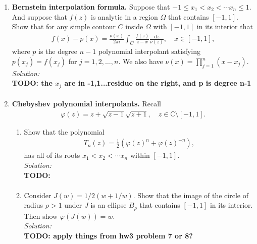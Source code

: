 \documentclass[10pt]{amsart}
\newcommand{\D}{\mathrm{d}}
\theoremstyle{nonumberplain}
\begin{document}
\begin{enumerate}[label={\bf {\arabic*}:}]
\newpage


\item \textbf{Bernstein interpolation formula.}   Suppose that $-1 \leq x_1 < x_2 < \cdots x_n \leq 1$. 
And suppose that $f(z)$ is analytic in a region $\Omega$ that contains $[-1,1]$.
Show that for any simple contour $C$ inside $\Omega$ with $[-1,1]$ in its interior that
\begin{align*}
	f(x) - p(x) = \frac{\nu(x)}{2 \pi i} \int_C \frac{f(z)}{z - x}
	\frac{\D z}{\nu(z)}, \quad x \in [-1,1],
\end{align*}
where $p$ is the degree $n - 1$ polynomial interpolant satisfying $p(x_j) = f(x_j)$ for $j = 1,2,\ldots,n$.
We also have $\nu(x) = \prod_{j=1}^n (x - x_j)$.\\

\noindent
\textit{Solution:} \\
\textbf{TODO: the $x_j$ are in -1,1...residue on the right, and p is degree n-1}
\begin{align*}
\end{align*}

\newpage


\item  \textbf{Chebyshev polynomial interpolants.}  Recall 
\begin{align*}
\varphi(z) = z + \sqrt{z - 1} \sqrt{z +1}, \quad z \in \mathbb C \setminus [-1,1].
\end{align*}

\begin{enumerate}
\item Show that the polynomial
\begin{align*}
T_n(z) = \frac 1 2 \left( \varphi(z)^n + \varphi(z)^{-n} \right),
\end{align*}
has all of its roots $x_1 < x_2 < \cdots x_n$ within $[-1,1]$. \\

\noindent
\textit{Solution:} \\
\textbf{TODO:}
\begin{align*}
\end{align*}

\item Consider $J(w) =  1/2 (w + 1/w)$. 
Show that the image of the circle of radius $\rho > 1$ under $J$ is an ellipse $B_\rho$ that contains $[-1,1]$ in its interior.
Then show $\varphi(J(w)) = w$. \\

\noindent
\textit{Solution:} \\
\textbf{TODO: apply things from hw3 problem 7 or 8?}
\begin{align*}
\end{align*}


\end{enumerate}
\end{enumerate}
\end{document}

